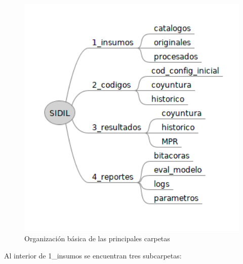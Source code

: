 \documentclass[
]{article}
\begin{document}
\begin{figure}
\includegraphics[width=4.62in]{images-1/03/organizacion_catalogos} \caption{Organización básica de las principales carpetas}\label{fig:organizacioncatalogos}
\end{figure}

Al interior de 1\_insumos se encuentran tres subcarpetas:
\end{document}
